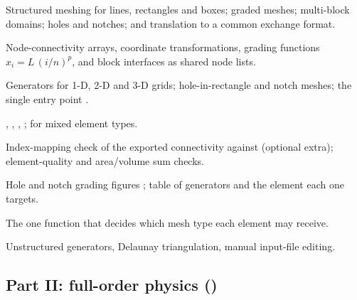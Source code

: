 \begin{description}[style=nextline,leftmargin=1em]
\item[Focus] Structured meshing for lines, rectangles and boxes; graded meshes; multi-block domains; holes and notches; and translation to a common exchange format.
\item[Mathematics] Node-connectivity arrays, coordinate transformations, grading functions $x_i = L\,(i/n)^p$, and block interfaces as shared node lists.
\item[Algorithm] Generators for 1-D, 2-D and 3-D grids; hole-in-rectangle and notch meshes; the single entry point .
\item[Implementation] , , , ;  for mixed element types.
\item[Verification] Index-mapping check of the exported connectivity against  (optional extra); element-quality and area/volume sum checks. 
\item[Figures and tables] Hole and notch grading figures ; table of generators and the element each one targets.
\item[Dispatcher] The one function that decides which mesh type each element may receive.
\item[Exclusions] Unstructured generators, Delaunay triangulation, manual input-file editing.
\end{description}

\subsection*{Part II: full-order physics (\fea{})}

